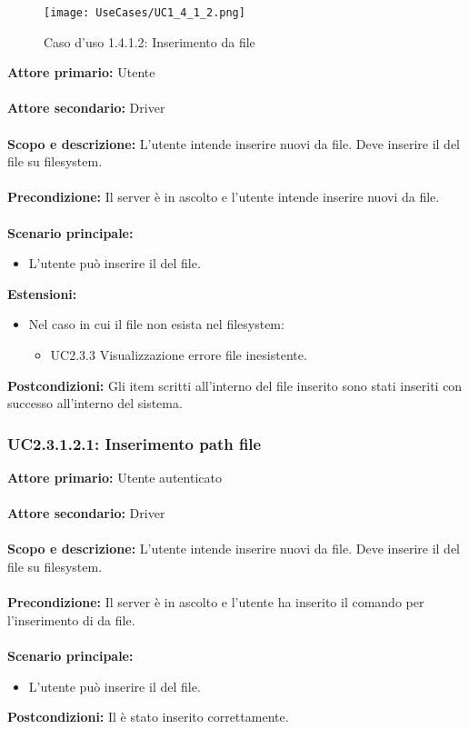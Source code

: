 \documentclass{scalatekids-article}
\begin{document}
\begin{figure}[H]
  \begin{center}
    \texttt{[image: UseCases/UC1\_4\_1\_2.png]}
    \caption*{Caso d'uso 1.4.1.2: Inserimento  da file}
  \end{center}
\end{figure}
\textbf{Attore primario:} Utente\\ \\
\textbf{Attore secondario:} Driver\\ \\
\textbf{Scopo e descrizione:} L'utente intende inserire nuovi  da file. Deve inserire il  del file su filesystem.\\ \\ %
\textbf{Precondizione:} Il server è in ascolto e l'utente intende inserire nuovi  da file.\\ \\
\textbf{Scenario principale:}
\begin{itemize}
  \item L'utente può inserire il  del file.
\end{itemize}
\textbf{Estensioni:}
\begin{itemize}
  \item Nel caso in cui il file non esista nel filesystem: %
  \begin{itemize}
    \item UC2.3.3 Visualizzazione errore file inesistente.
  \end{itemize}
\end{itemize}
\textbf{Postcondizioni:} Gli item scritti all'interno del file inserito sono stati inseriti con successo all'interno del sistema.%

\subsubsection{UC2.3.1.2.1: Inserimento path file} %

\textbf{Attore primario:} Utente autenticato\\ \\
\textbf{Attore secondario:} Driver\\ \\
\textbf{Scopo e descrizione:} L'utente intende inserire nuovi  da file. Deve inserire il  del file su filesystem.\\ \\
\textbf{Precondizione:} Il server è in ascolto e l'utente ha inserito il comando per l'inserimento di  da file.\\ \\
\textbf{Scenario principale:}
\begin{itemize}
  \item L'utente può inserire il  del file.
\end{itemize}
\textbf{Postcondizioni:} Il  è stato inserito correttamente.
\end{document}

